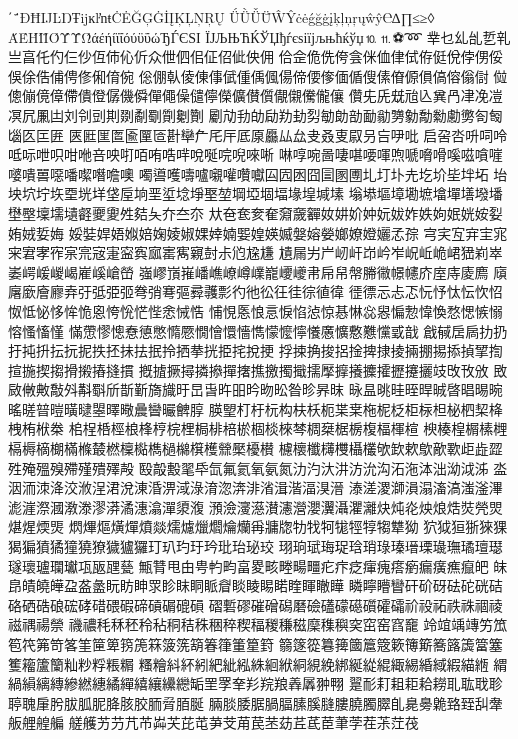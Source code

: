 ΄΅ĐĦĲĿŊŦĳĸŀŉŧĊĖĞĢĠİĮĶĻŅŖŲ
ǗǛǙǕŴŶċėǵğġįķļņŗųŵŷ℮∆∏≤≥◊
ΆΈΉΊΪΌΎΫΏάέήίϊΐόύϋΰώЂЃЄЅІ
ЇЈЉЊЋЌЎЏђѓєѕіїјљњћќўџ⒑⒒⚽➿
丵乜乣乨乴乵亗亯仛仢仨仯仾伂伈伒众伳伵佀佂佋佌佒佣
佮佱佹侁侉侌侎侐侓侙侟侹侻侼侽俀俁俆俈俌俜俢俰俼倇
倊倗倝倰倲倳倵偅偊偑偒偙偠偧偭偱傁傃傄傆傊傐傛傟傠
傡傯傰傹傽僀僓僜僝僟僢僤僶僺儙儜儝儣儧儨儬儭儯儱儴
儹兂兏兓兘兦兾冎冿凂凒凕凥凲凷刘刢剅剘剟劀劅劕劖劗
劚劥劧劰劶劷劸劽勄勆勏勔勜勥勨勪勬勴勶匌匓匘匛匞匥
匧匨匩匫匬匰匼卙卛厃厇厈厎厡厵厸厽叏叒叓叞叧吂吚吡
启呄呇呏呞呤呧呩呭呮咁咃咅咉咑咟哊哠哶哾唌唍唲唻唽
啉啍啘啚啛啿喓喗喣嗁嗋嗗嗘嗞嗿嘊嘙嘳嘼噁噃噄噆噡噢
噣噵嚄嚋嚧嚫嚾囋囐囜囥囦囧圁圂圑圠圢圤圥圪圿坒坢坧
坮坱坹坾垁垔垙垟垡垕垧垩垽埝埩埾堃堈埡堌堛堟堭堿塐
塕塨塸墇墈墌墖墠墡墢墦壄壂壈壖壝壡夒夓夝夡夨夰夳夵
夶夿奃奒奞奫奯奲奻妌妎妕妧妭妰妷姁姄姯姲姴姷娀娎娒
娞娤娨娪娰婄婅婈婌婐婞婻媐媓媖媙媻嫆嫈嫏嫽嬁孋孞孮
宆宎宐宑宔宨宩宭宯宱宲宺宼寁寍寏寙寚寯寴尌尗尦尮尲
尵屚屴屵屻屽岇岒岝岲岴峗峮峱峲崒崣崿嵈嵕嵑嵟嵠嵢嵤
嵹嵺嵿嶊嶓嶕嶛嶟嶫巃巎巙帇帍帠幋幐幑幜幰庎庢庤庱廌
廎廜廞廥廫弆弙弤弫弬弮弰弿彄彛彠彯彴彵彸彺徍徖徝徫
徰徱忈忐忑忨忬忲忶忺怊怓怟怭恀恈恑恖恗恱恾悂悆悈悎
悑悓悘悢悥悷惂惉惊惎惏惢惥惼愂愇愌愗愢愱愵愹慅慉慬
慲慸憀憁憃憄憋憜憠憪懀懁懎懏懞懡懧懩懬懭懯戁戃戜戠
戧戫扂扄扐扔扜扽抍抎抏抳抶抷抺抾抿拎拪拲挄挋挓挩挭
捊捒捔捘捛捦捭捸掕掚掤掦掭揁揅揈揎揓揳搊搰摋摏摓摜
摡摣撅撏撛撡撣撦撨撽擉擑擩擪擵攁攈攉攊攓攦攱攺攼攽
敃敐敒敟敽斘斠斣斦斮斳旖旘旴旵旾旿昍昑昒昖昝昣昦昩
昹昷晀晆晊晘晠晵晿晹晼暚暛暜暟曂曃曌曎曔曟曫曮朇朜
朠朢朾杅杬构枎枖枙枼枽柂柅柉柜柡柦柲柶栔栙栧栯栿桊
桘桯桰桱桹桻梈梡梩梮棑棓棜棝棪棶棽椆椉椐椖椱楅楎楦
楰楱楻榍榡榸槅槈樀樃樠樤樷橪檁檆檇檛檰檱檴檾檿櫌櫕
櫖櫰櫼欂欆欇欉欨欫欶歍歒歝歫歮歰殅殗殟殠殢殣殨殬殸
殹毃毄毣氒氙氟氦氧氨氮氻汋汏汫汸沇沟沰沲泍泏泑泧泲
泴洇洏洓洚洨浟浧涒涗涷涽淠淢淥淯淴渀渄渻湒湝湢湨溍
溙溠溭溮溳溻滀滈滍滏滭滮漄漈漍漖漛漻漭潏潓潝潬澃澓
澦澰濅濨濽瀗瀯瀴瀷灄灈灕炔炖炛炴烺焅焋焭焸煁煋煗煚
熌熚熰熿燀燌燚燸爈爉爓爚爤爯牅牎牞牫牱牻牼犉犓犨狕
狖狘狟狾猍猓猲猵獖獝獞獟獠獩獹玀玎玐玓玗玪玭珆珌珓
珝珦珷珻珿琀琑琭瑧瑨瑮璏璑璚璮璱璲瓌瓐瓓瓛瓨瓪瓼甆
甒甧甩甶甹畃畇畗畟畡畻畼疅疕疜疺瘒瘣瘩瘹瘺癀癄癙皅
皌皍皟皢皣盁盋盠盶眆眒眔眕眜眮眽睂睒睖睗睰睳睴瞮瞱
瞵矃矒矕矸砎砑砝砣硄硈硌硒硞硠硡硣碏碨碬碲碽碿磇磒
磖磛磟磪磳磶磿礆礚礞礠礩礭礵祄祋祏祑祩祻祾禌禑禓禜
禨禯秏秝秠秢秥秱秸秼稇稡稧稫稯稴稵穈穕穥穾窋窑窞竉
竛竩竬竱竻笟笣笩笰笴笿筀筪箄箉箎箖箥箲箶箺箻箽篂篈
篛篴篵篹篺簂簄簆簌簙簛簥簬簴簹簺籆籕籚籣籼粆粰粻糏
糔糩紏紑紖紦紪紭絑絗絥絧絸絻綁綖緃緄緅緆緍緎縀緢緪
緭緺縜縭縳縿繎繐繘繟繥纕纝纞缿罜罦羍羏羦羪羴羼翀翈
翨耏耓耝耟耠耮耴耾聀聄聤聭肁肹胈胍胒胮胲胶胹脋脜脠
脼腅腇腒腡腷膆膎膖膢膮臅臎臫臰臱臲臵臸舏舝舨艃艎艑
艖艧艻芀芁芇芔芖芘芚芛芠苚苠苤苭茊茋茞茟茡茬茮茳茷
